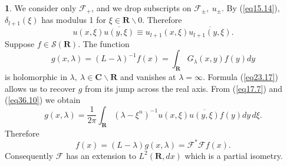 \documentclass{surv-l}
\theoremstyle{plain}
\theoremstyle{definition}
\newtheorem*{sop}{\sc{Sketch of Proof}}
\numberwithin{equation}{chapter}
\begin{document}
\begin{sop}
We consider only $\mathscr{F}_{+}$, and we drop subscripts on $\mathscr{F}_{\pm},\  u_{\pm}$. By (\ref{eq15.14}), $\delta_{l+1}(\xi)$ has modulus 1 for $\xi\in \mathbf{R}\backslash 0$. Therefore
\begin{equation}\label{eq36.10}
u(x, \xi)\overline{u(y, \xi)}\equiv u_{l+1}(x, \xi)\overline{u_{l+1}(y, \xi)}.
\end{equation}
Suppose $f\in \mathscr{S}(\mathbf{R})$. The function
\begin{equation*}
g(x, \lambda)=(L-\lambda)^{-1}f(x)=\int_{\mathbf{R}}G_{\lambda}(x, y)f(y)dy
\end{equation*}
is holomorphic in $\lambda,\ \lambda \in \mathbf{C}\backslash \mathbf{R}$ and vanishes at $\lambda =\infty$. Formula (\ref{eq23.17}) allows us to recover $g$ from its jump across the real axis. From (\ref{eq17.7}) and (\ref{eq36.10}) we obtain
\begin{equation*}
 g(x, \lambda)=\frac{1}{2\pi}\int_{\mathbf{R}}(\lambda-\xi^{n})^{-1}u(x, \xi)\overline{u(y,\xi)}f(y)dy\,d\xi.
\end{equation*}
Therefore
\begin{equation*}
f(x)=(L-\lambda)g(x, \lambda)=\mathscr{F}^{*}\mathscr{F}f(x).
\end{equation*}
Consequently $\mathscr{F}$ has an extension to $L^{2} (\mathbf{R}, dx)$ which is a partial isometry.


\end{sop}
\end{document}
